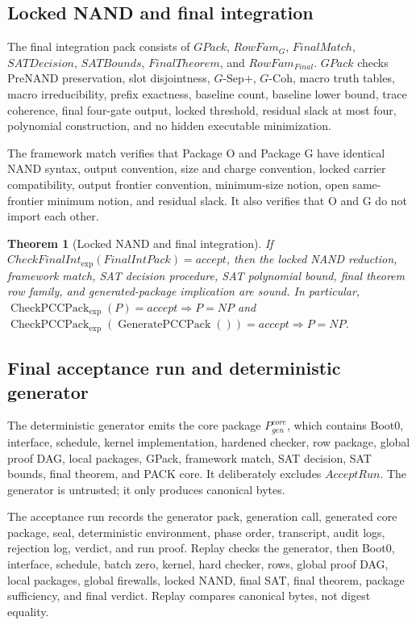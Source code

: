 \documentclass[10.5pt,a4paper]{article}
\newtheorem{theorem}{Theorem}[section]
\newcommand{\CheckPack}{\operatorname{CheckPCCPack}_{\exp}}
\newcommand{\GenPack}{\operatorname{GeneratePCCPack}}
\begin{document}
\subsection{Locked NAND and final integration}
The final integration pack consists of \(GPack\), \(RowFam_G\), \(FinalMatch\), \(SATDecision\), \(SATBounds\), \(FinalTheorem\), and \(RowFam_{Final}\).  \(GPack\) checks PreNAND preservation, slot disjointness, \(G\)-Sep\(+\), \(G\)-Coh, macro truth tables, macro irreducibility, prefix exactness, baseline count, baseline lower bound, trace coherence, final four-gate output, locked threshold, residual slack at most four, polynomial construction, and no hidden executable minimization.

The framework match verifies that Package O and Package G have identical NAND syntax, output convention, size and charge convention, locked carrier compatibility, output frontier convention, minimum-size notion, open same-frontier minimum notion, and residual slack. It also verifies that O and G do not import each other.

\begin{theorem}[Locked NAND and final integration]
If \(CheckFinalInt_{\exp}(FinalIntPack)=accept\), then the locked NAND reduction, framework match, SAT decision procedure, SAT polynomial bound, final theorem row family, and generated-package implication are sound. In particular, \(\CheckPack(P)=accept\Rightarrow P=NP\) and \(\CheckPack(\GenPack())=accept\Rightarrow P=NP\).
\end{theorem}

\subsection{Final acceptance run and deterministic generator}
The deterministic generator emits the core package \(P^{core}_{gen}\), which contains Boot0, interface, schedule, kernel implementation, hardened checker, row package, global proof DAG, local packages, GPack, framework match, SAT decision, SAT bounds, final theorem, and PACK core. It deliberately excludes \(AcceptRun\). The generator is untrusted; it only produces canonical bytes.

The acceptance run records the generator pack, generation call, generated core package, seal, deterministic environment, phase order, transcript, audit logs, rejection log, verdict, and run proof. Replay checks the generator, then Boot0, interface, schedule, batch zero, kernel, hard checker, rows, global proof DAG, local packages, global firewalls, locked NAND, final SAT, final theorem, package sufficiency, and final verdict. Replay compares canonical bytes, not digest equality.
\end{document}
